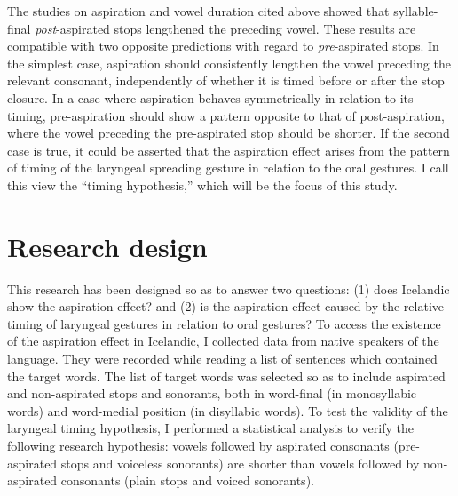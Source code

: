 \documentclass[11pt,a4paper,oneside,openany]{memoir}\usepackage[]{graphicx}\usepackage[]{color}
\begin{document}
The studies on aspiration and vowel duration cited above showed that syllable-final \textit{post}-aspirated stops lengthened the preceding vowel.
These results are compatible with two opposite predictions with regard to \textit{pre}-aspirated stops.
In the simplest case, aspiration should consistently lengthen the vowel preceding the relevant consonant, independently of whether it is timed before or after the stop closure.
In a case where aspiration behaves symmetrically in relation to its timing, pre-aspiration should show a pattern opposite to that of post-aspiration, where the vowel preceding the pre-aspirated stop should be shorter.
If the second case is true, it could be asserted that the aspiration effect arises from the pattern of timing of the laryngeal spreading gesture in relation to the oral gestures.
I call this view the ``timing hypothesis,'' which will be the focus of this study.

\section{Research design}

This research has been designed so as to answer two questions: (1) does Icelandic show the aspiration effect? and (2) is the aspiration effect caused by the relative timing of laryngeal gestures in relation to oral gestures?
To access the existence of the aspiration effect in Icelandic, I collected data from native speakers of the language.
They were recorded while reading a list of sentences which contained the target words.
The list of target words was selected so as to include aspirated and non-aspirated stops and sonorants, both in word-final (in monosyllabic words) and word-medial position (in disyllabic words).
To test the validity of the laryngeal timing hypothesis, I performed a statistical analysis to verify the following research hypothesis: vowels followed by aspirated consonants (pre-aspirated stops and voiceless sonorants) are shorter than vowels followed by non-aspirated consonants (plain stops and voiced sonorants).
\end{document}
